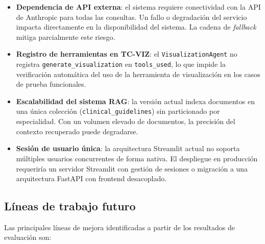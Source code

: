 \begin{itemize}[nosep, leftmargin=*]
  \item \textbf{Dependencia de API externa}: el sistema requiere conectividad
    con la API de Anthropic para todas las consultas. Un fallo o degradación
    del servicio impacta directamente en la disponibilidad del sistema.
    La cadena de \textit{fallback} mitiga parcialmente este riesgo.
  \item \textbf{Registro de herramientas en TC-VIZ}: el \texttt{VisualizationAgent}
    no registra \texttt{generate\_visualization} en \texttt{tools\_used},
    lo que impide la verificación automática del uso de la herramienta de
    visualización en los casos de prueba funcionales.
  \item \textbf{Escalabilidad del sistema RAG}: la versión actual indexa
    documentos en una única colección (\texttt{clinical\_guidelines}) sin
    particionado por especialidad. Con un volumen elevado de documentos,
    la precisión del contexto recuperado puede degradarse.
  \item \textbf{Sesión de usuario única}: la arquitectura Streamlit actual
    no soporta múltiples usuarios concurrentes de forma nativa. El despliegue
    en producción requeriría un servidor Streamlit con gestión de sesiones
    o migración a una arquitectura FastAPI con frontend desacoplado.
\end{itemize}

\subsection{Líneas de trabajo futuro}
\label{sec:trabajo_futuro}

Las principales líneas de mejora identificadas a partir de los resultados
de evaluación son:

